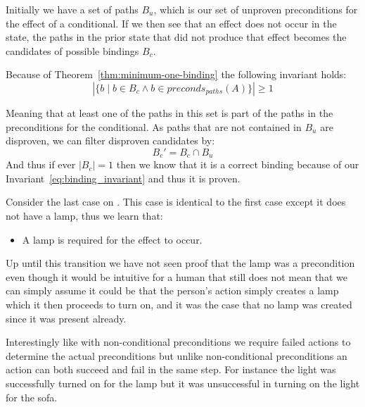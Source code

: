 \documentclass[\master/Master.tex]{subfiles}
\begin{document}
Initially we have a set of paths $B_u$, which is our set of unproven preconditions for the effect of a conditional.
If we then see that an effect does not occur in the state, the paths in the prior state that did not produce that effect becomes the candidates of possible bindings $B_c$.

Because of Theorem~\ref{thm:minimum-one-binding} the following invariant holds:
\begin{equation} \label{eq:binding_invariant}
\left| \{b  \mid  b \in B_c \land b \in preconds_{paths}(A)\} \right|  \ge 1
\end{equation}


Meaning that at least one of the paths in this set is part of the paths in the preconditions for the conditional. As paths that are not contained in $B_u$ are disproven, we can filter disproven candidates by:
\begin{equation}
    B_c' = B_c \cap B_u
\end{equation}
And thus if ever $|B_c| = 1$ then we know that it is a correct binding because of our Invariant~\ref{eq:binding_invariant} and thus it is proven.

\begin{example}\label{ex:ca:light-on-3}
    Consider the last case on . This case is identical to the first case except it does not have a lamp, thus we learn that:
    \begin{itemize}
        \item A lamp is required for the effect to occur.
    \end{itemize}
    Up until this transition we have not seen proof that the lamp was a precondition even though it would be intuitive for a human that still does not mean that we can simply assume it could be that the person's action simply creates a lamp which it then proceeds to turn on, and it was the case that no lamp was created since it was present already.
    
    Interestingly like with non-conditional preconditions we require failed actions to determine the actual preconditions but unlike non-conditional preconditions an action can both succeed and fail in the same step. For instance the light was successfully turned on for the lamp but it was unsuccessful in turning on the light for the sofa.

\end{example}
\end{document}
